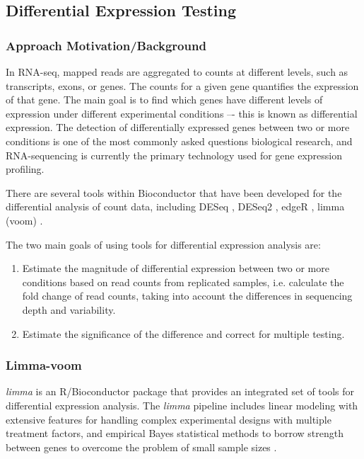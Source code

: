     \subsection{Differential Expression Testing}
    \subsubsection{Approach Motivation/Background}
    In RNA-seq, mapped reads are aggregated to counts at different levels, such as transcripts, exons, or genes. The counts for a given gene quantifies the expression of that gene. The main goal is to find which genes have different levels of expression under different experimental conditions –- this is known as differential expression.
    The detection of differentially expressed genes between two or more conditions is one of the most commonly asked questions biological research, and RNA-sequencing is currently the primary technology used for gene expression profiling.

    There are several tools within Bioconductor that have been developed for the differential analysis of count data, including DESeq \cite{}, DESeq2 \cite{}, edgeR \cite{Robinson2010EdgeR:Data}, limma (voom) \cite{Ritchie2015LimmaStudies}.

    The two main goals of using tools for differential expression analysis are:
    \begin{enumerate}
    \item Estimate the magnitude of differential expression between two or more conditions based on read counts from replicated samples, i.e. calculate the fold change of read counts, taking into account the differences in sequencing depth and variability.
    \item Estimate the significance of the difference and correct for multiple testing.
    \end{enumerate}

        
        \subsubsection{Limma-voom}
        \textit{limma} is an R/Bioconductor package \cite{Ritchie2015LimmaStudies, smyth2004linear}  that provides an integrated set of tools for differential expression analysis. The \textit{limma} pipeline includes linear modeling with extensive features for handling complex experimental designs with multiple treatment factors, and empirical Bayes statistical methods to borrow strength between genes to overcome the problem of small sample sizes \cite{Ritchie2015LimmaStudies}.

